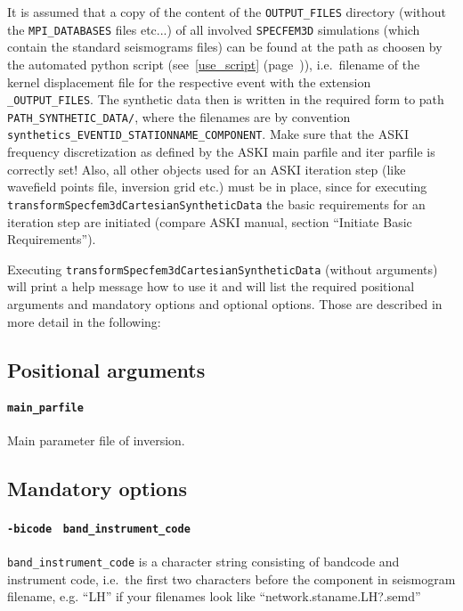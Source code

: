 \documentclass[12pt,a4paper]{article}
\newcommand{\lcode}[1]{\nolinkurl{#1}}
\newcommand{\ASKI}{ {\ttfamily ASKI} }
\newcommand{\myref}[1]{\ref{#1} (page~\pageref{#1})}
\begin{document}
It is assumed that a copy of the content of the \lcode{OUTPUT_FILES} directory 
(without the \lcode{MPI_DATABASES} files etc...)
of all involved \lcode{SPECFEM3D} simulations (which contain the standard seismograms files) can be found at 
the path as choosen by the automated python script (see~\myref{use_script}), i.e.\ filename of the kernel 
displacement file for the respective event with the extension \lcode{_OUTPUT_FILES}. 
The synthetic data then is written in the required form to path \lcode{PATH_SYNTHETIC_DATA/}, where the 
filenames are by convention \lcode{synthetics_EVENTID_STATIONNAME_COMPONENT}. Make sure that the \ASKI{} frequency 
discretization as defined by the \ASKI{} main parfile and iter parfile is correctly set! Also, all other objects
used for an \ASKI{} iteration step (like wavefield points file, inversion grid etc.) must be in place, since
for executing \lcode{transformSpecfem3dCartesianSyntheticData} the basic requirements for an iteration step
are initiated (compare \ASKI{} manual, section ``Initiate Basic Requirements'').

Executing \lcode{transformSpecfem3dCartesianSyntheticData} (without arguments) will print a
help message how to use it and will list the required positional arguments and mandatory
options and optional options. Those are described in more detail in the following:

\subsection*{Positional arguments}
\paragraph{\lcode{main_parfile}}
Main parameter file of inversion.

\subsection*{Mandatory options}
\paragraph{\lcode{-bicode} \lcode{ band_instrument_code}}
\lcode{band_instrument_code} is a character string consisting of bandcode and instrument code, i.e.\ 
the first two characters before the component in seismogram filename, e.g. ``LH'' if your filenames 
look like ``network.staname.LH?.semd''
\end{document}
